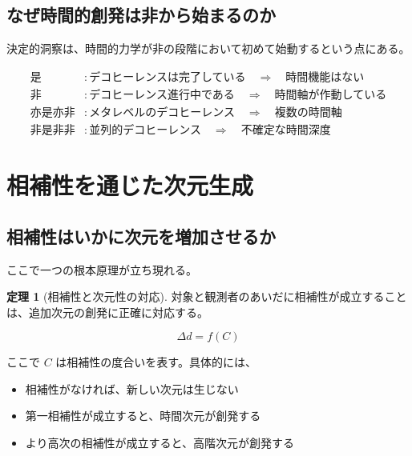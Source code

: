 \documentclass[12pt,a4paper]{article}
\theoremstyle{definition}
\newtheorem{theorem}[definition]{定理}
\begin{document}
\subsection{なぜ時間的創発は非から始まるのか}

決定的洞察は、時間的力学が非の段階において初めて始動するという点にある。

\begin{equation}
\begin{aligned}
\text{是} &: \text{デコヒーレンスは完了している} \quad \Rightarrow \quad \text{時間機能はない} \\
\text{非} &: \text{デコヒーレンス進行中である} \quad \Rightarrow \quad \text{時間軸が作動している} \\
\text{亦是亦非} &: \text{メタレベルのデコヒーレンス} \quad \Rightarrow \quad \text{複数の時間軸} \\
\text{非是非非} &: \text{並列的デコヒーレンス} \quad \Rightarrow \quad \text{不確定な時間深度}
\end{aligned}
\end{equation}

\section{相補性を通じた次元生成}

\subsection{相補性はいかに次元を増加させるか}

ここで一つの根本原理が立ち現れる。

\begin{theorem}[相補性と次元性の対応]
対象と観測者のあいだに相補性が成立することは、追加次元の創発に正確に対応する。

\begin{equation}
\Delta d = f(C)
\end{equation}

ここで $C$ は相補性の度合いを表す。具体的には、
\begin{itemize}
    \item 相補性がなければ、新しい次元は生じない
    \item 第一相補性が成立すると、時間次元が創発する
    \item より高次の相補性が成立すると、高階次元が創発する
\end{itemize}
\end{theorem}
\end{document}
